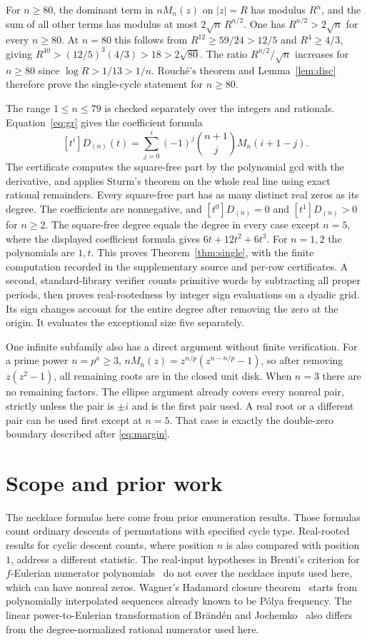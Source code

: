 \documentclass[11pt]{article}
\begin{document}
For $n\ge80$, the dominant term in $nM_n(z)$ on $|z|=R$ has modulus
$R^n$, and the sum of all other terms has modulus at most
$2\sqrt n\,R^{n/2}$. One has $R^{n/2}>2\sqrt n$ for every $n\ge80$.
At $n=80$ this follows from
$R^{12}\ge59/24>12/5$ and $R^4\ge4/3$, giving
$R^{40}>(12/5)^3(4/3)>18>2\sqrt{80}$.
The ratio $R^{n/2}/\sqrt n$ increases for $n\ge80$ since
$\log R>1/13>1/n$. Rouch\'e's theorem and Lemma~\ref{lem:disc}
therefore prove the single-cycle statement for $n\ge80$.

The range $1\le n\le79$ is checked separately over the integers and
rationals. Equation~\eqref{eq:gr} gives the coefficient formula
\[
[t^i]D_{(n)}(t)=\sum_{j=0}^i(-1)^j
        \binom{n+1}{j}M_n(i+1-j).
\]
The certificate computes the square-free part by the polynomial gcd
with the derivative, and applies Sturm's theorem on the whole real
line using exact rational remainders. Every square-free part has
as many distinct real zeros as its degree. The coefficients are
nonnegative, and $[t^0]D_{(n)}=0$ and $[t^1]D_{(n)}>0$ for $n\ge2$.
The square-free degree equals the degree in every case except $n=5$,
where the displayed coefficient formula gives $6t+12t^2+6t^3$.
For $n=1,2$ the polynomials are $1,t$. This proves
Theorem~\ref{thm:single}, with the finite computation recorded
in the supplementary source and per-row certificates. A second,
standard-library verifier counts primitive words by subtracting all
proper periods, then proves real-rootedness by integer sign evaluations
on a dyadic grid. Its sign changes account for the entire degree after
removing the zero at the origin. It evaluates the exceptional size five
separately.

One infinite subfamily also has a direct argument without finite
verification. For a prime power $n=p^a\ge3$,
$nM_n(z)=z^{n/p}(z^{n-n/p}-1)$, so after removing $z(z^2-1)$,
all remaining roots are in the closed unit disk. When $n=3$ there
are no remaining factors. The ellipse
argument already covers every nonreal pair, strictly unless the
pair is $\pm i$ and is the first pair used. A real root or a
different pair can be used first except at $n=5$. That case is
exactly the double-zero boundary described after
\eqref{eq:margin}.

\section{Scope and prior work}

The necklace formulas here come from prior enumeration results.
Those formulas count ordinary descents of permutations with specified
cycle type. Real-rooted results for cyclic descent counts, where
position $n$ is also compared with position $1$, address a different
statistic. The real-input hypotheses in Brenti's criterion for
$f$-Eulerian numerator polynomials~\cite[Theorem 4.4.1]{Brenti}
do not cover the necklace inputs used here, which can have nonreal
zeros. Wagner's Hadamard closure theorem~\cite{Wagner} starts from
polynomially interpolated sequences already known to be P\'olya
frequency. The linear power-to-Eulerian
transformation of Br\"and\'en and Jochemko~\cite{BJ} also differs
from the degree-normalized rational numerator used here.
\end{document}
